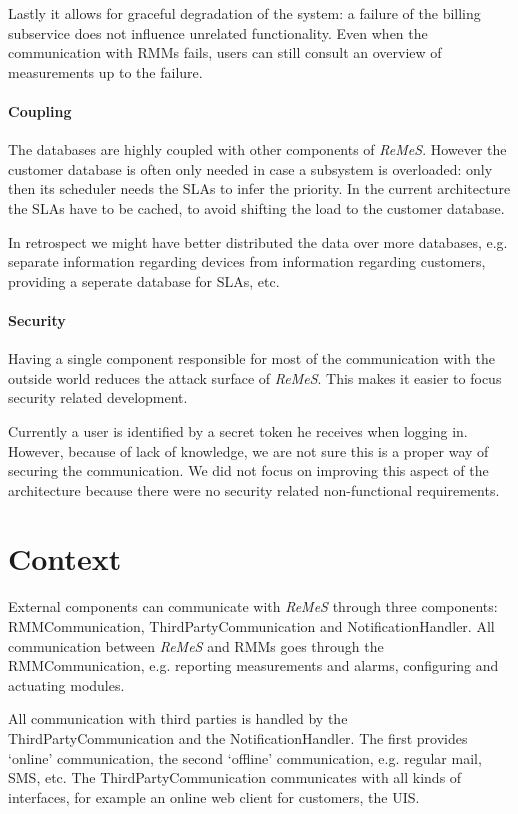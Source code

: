 \documentclass[a4paper,10pt]{article}
\newcommand{\rem}{\emph{ReMeS}\xspace}
\begin{document}
Lastly it allows for graceful degradation of the system: a failure of the billing subservice does not influence unrelated functionality.
Even when the communication with RMMs fails, users can still consult an overview of measurements up to the failure.

\paragraph{Coupling}
The databases are highly coupled with other components of \rem. However the customer database is often only needed in case a subsystem is overloaded: only then its scheduler needs the SLAs to infer the priority. In the current architecture the SLAs have to be cached, to avoid shifting the load to the customer database. 

In retrospect we might have better distributed the data over more databases, e.g. separate information regarding devices from information regarding customers, providing a seperate database for SLAs, etc.

\paragraph{Security}
Having a single component responsible for most of the communication with the outside world reduces the attack surface of \rem. This makes it easier to focus security related development.

Currently a user is identified by a secret token he receives when logging in. However, because of lack of knowledge, we are not sure this is a proper way of securing the communication. We did not focus on improving this aspect of the architecture because there were no security related non-functional requirements.

\section{Context}\label{sec:context}
External components can communicate with \rem through three components: RMMCommunication, ThirdPartyCommunication and NotificationHandler.
All communication between \rem and RMMs goes through the RMMCommunication, e.g. reporting measurements and alarms, configuring and actuating modules.

All communication with third parties is handled by the ThirdPartyCommunication and the NotificationHandler. The first provides `online' communication, the second `offline' communication, e.g. regular mail, SMS, etc.
The ThirdPartyCommunication communicates with all kinds of interfaces, for example an online web client for customers, the UIS.
\end{document}

